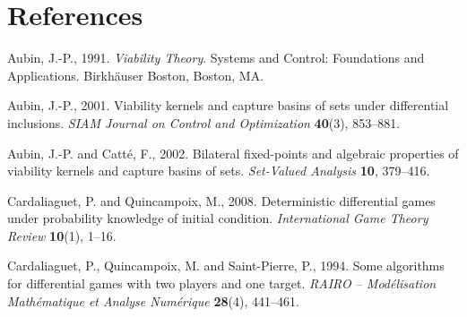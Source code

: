 \documentclass[10pt,twocolumn]{article}
\theoremstyle{definition}
\begin{document}
\section{References}
Aubin, J.-P., 1991. \emph{Viability Theory}. Systems and Control: Foundations and
Applications. Birkh\"auser Boston, Boston, MA.

Aubin, J.-P., 2001. Viability kernels and capture basins of sets under differential
inclusions. \emph{SIAM Journal on Control and Optimization} \textbf{40}(3), 853--881.

Aubin, J.-P. and Catt\'e, F., 2002. Bilateral fixed-points and algebraic properties of
viability kernels and capture basins of sets. \emph{Set-Valued Analysis} \textbf{10},
379--416.

Cardaliaguet, P. and Quincampoix, M., 2008. Deterministic differential games under
probability knowledge of initial condition. \emph{International Game Theory Review}
\textbf{10}(1), 1--16.

Cardaliaguet, P., Quincampoix, M. and Saint-Pierre, P., 1994. Some algorithms for differential
games with two players and one target. \emph{RAIRO -- Mod\'elisation Math\'ematique et Analyse
Num\'erique} \textbf{28}(4), 441--461.
\end{document}
